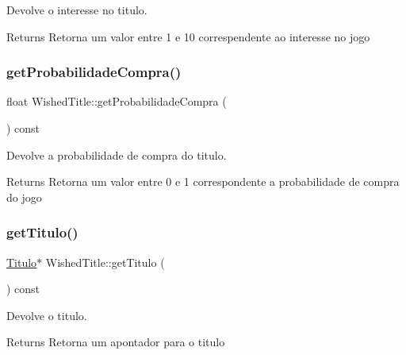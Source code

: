Devolve o interesse no titulo. 

\begin{DoxyReturn}{Returns}
Retorna um valor entre 1 e 10 correspendente ao interesse no jogo 
\end{DoxyReturn}
\mbox{\label{class_wished_title_a9076a3f48cb0bbd435908c392e5041a9}} 
\subsubsection{\texorpdfstring{get\+Probabilidade\+Compra()}{getProbabilidadeCompra()}}
{\footnotesize\ttfamily float Wished\+Title\+::get\+Probabilidade\+Compra (\begin{DoxyParamCaption}{ }\end{DoxyParamCaption}) const\hspace{0.3cm}{\ttfamily [inline]}}



Devolve a probabilidade de compra do titulo. 

\begin{DoxyReturn}{Returns}
Retorna um valor entre 0 e 1 correspondente a probabilidade de compra do jogo 
\end{DoxyReturn}
\mbox{\label{class_wished_title_a9ca6e92a26bb2f319a39d5a03b0c42bd}} 
\subsubsection{\texorpdfstring{get\+Titulo()}{getTitulo()}}
{\footnotesize\ttfamily \mbox{\hyperlink{class_titulo}{Titulo}}$\ast$ Wished\+Title\+::get\+Titulo (\begin{DoxyParamCaption}{ }\end{DoxyParamCaption}) const\hspace{0.3cm}{\ttfamily [inline]}}



Devolve o titulo. 

\begin{DoxyReturn}{Returns}
Retorna um apontador para o titulo 
\end{DoxyReturn}
\mbox{\label{class_wished_title_a3acf82b03096f649740573441e1cb343}} 
